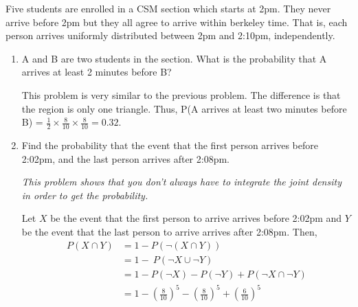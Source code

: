 \question Five students are enrolled in a CSM section which starts at 2pm. They never arrive before 2pm but they all agree to arrive within berkeley time. That is, each person arrives uniformly distributed between 2pm and 2:10pm, independently. 

\begin{enumerate}[label=(\alph*)] 
\item A and B are two students in the section. What is the probability that A arrives at least 2 minutes before B? 
\begin{solution}[4cm] 
This problem is very similar to the previous problem. The difference is that the region is only one triangle. Thus, P(A arrives at least two minutes before B) = $\frac{1}{2} \times \frac{8}{10} \times \frac{8}{10} = 0.32$. 
\end{solution}

\item Find the probability that the event that the first person arrives before 2:02pm, and the last person arrives after 2:08pm. 
\begin{solution}[4cm] 
\textit{This problem shows that you don't always have to integrate the joint density in order to get the probability.} 

Let $X$ be the event that the first person to arrive arrives before 2:02pm and $Y$ be the event that the last person to arrive arrives after 2:08pm. Then, 
\begin{align*}
    P(X \cap Y) &= 1 - P(\neg (X \cap Y)) \\
                &= 1 - \ P(\neg X \cup \neg Y) \\
                &= 1 - P(\neg X) - P(\neg Y) + P(\neg X \cap \neg Y) \\
                &= 1 - (\frac{8}{10})^5 - (\frac{8}{10})^5+ ({\frac{6}{10}})^5
\end{align*}

\end{solution}
\end{enumerate}
